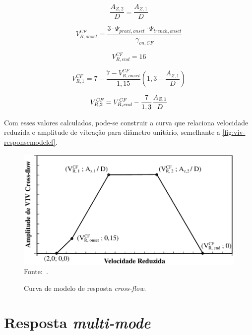 \begin{equation}
\frac{A_{Z,2}}{D} = \frac{A_{Z,1}}{D}
\end{equation}

\begin{equation}
V_{R,\mathit{onset}}^\mathit{CF} = \frac{3 \cdot \Psi_{\mathit{proxi}, \mathit{onset}} \cdot  \Psi_{\mathit{trench}, \mathit{onset}}}{\gamma_{\mathit{on}, \mathit{CF}}}
\end{equation}

\begin{equation}
V_{R,\mathit{end}}^\mathit{CF} = 16
\end{equation}

\begin{equation}
V_{R, 1}^\mathit{CF} = 7 - \frac{7 - V^\mathit{CF}_{R, \mathit{onset}}}{1,15} \left(1,3 - \frac{A_{Z,1}}{D}\right)
\end{equation}

\begin{equation}
V_{R, 2}^\mathit{CF} = V^\mathit{CF}_{R, \mathit{end}} - \frac{7}{1,3} \frac{A_{Z, 1}}{D}\\
\end{equation}

Com esses valores calculados, pode-se construir a curva que relaciona velocidade reduzida e amplitude de vibração para diâmetro unitário, semelhante a \autoref{fig:viv-responsemodelcf}.

\begin{figure}[!ht]
    \centering
    \caption{Curva de modelo de resposta \textit{cross-flow}.}\label{fig:viv-responsemodelcf}
    \includegraphics[width=0.8\linewidth]{imagens/response_model_CF}
    \\Fonte:~.
\end{figure}


\section{\label{sec:multimode}Resposta \textit{multi-mode}}


